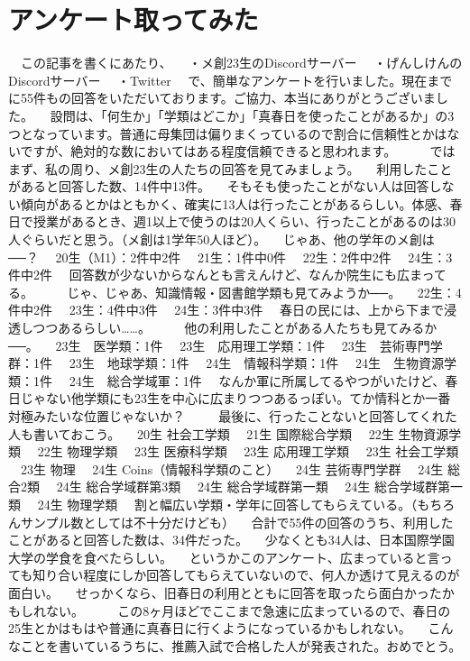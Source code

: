 \documentclass[
paper=a6,
fontsize=7pt,jafontsize=7pt,
baselineskip=1.6zh,
book,
hanging_punctuation,
head_space=10truemm,foot_space=10truemm
]{jlreq}
\begin{document}
\chapter{アンケート取ってみた}
　この記事を書くにあたり、
　・メ創23生のDiscordサーバー
　・げんしけんのDiscordサーバー
　・Twitter
　で、簡単なアンケートを行いました。現在までに55件もの回答をいただいております。ご協力、本当にありがとうございました。
　設問は、「何生か」「学類はどこか」「真春日を使ったことがあるか」の3つとなっています。普通に母集団は偏りまくっているので割合に信頼性とかはないですが、絶対的な数においてはある程度信頼できると思われます。
　
　ではまず、私の周り、メ創23生の人たちの回答を見てみましょう。
　利用したことがあると回答した数、14件中13件。
　そもそも使ったことがない人は回答しない傾向があるとかはともかく、確実に13人は行ったことがあるらしい。体感、春日で授業があるとき、週1以上で使うのは20人くらい、行ったことがあるのは30人ぐらいだと思う。（メ創は1学年50人ほど）。
　じゃあ、他の学年のメ創は──？
　20生（M1）：2件中2件
　21生：1件中0件
　22生：2件中2件
　24生：3件中2件
　回答数が少ないからなんとも言えんけど、なんか院生にも広まってる。
　
　じゃ、じゃあ、知識情報・図書館学類も見てみようか──。
　22生：4件中2件
　23生：4件中3件
　24生：3件中3件
　春日の民には、上から下まで浸透しつつあるらしい……。
　
　他の利用したことがある人たちも見てみるか──。
　23生　医学類：1件
　23生　応用理工学類：1件
　23生　芸術専門学群：1件
　23生　地球学類：1件
　24生　情報科学類：1件
　24生　生物資源学類：1件
　24生　総合学域軍：1件
　なんか軍に所属してるやつがいたけど、春日じゃない他学類にも23生を中心に広まりつつあるっぽい。てか情科とか一番対極みたいな位置じゃないか？
　
　最後に、行ったことないと回答してくれた人も書いておこう。
　20生	社会工学類
　21生	国際総合学類
　22生	生物資源学類
　22生	物理学類
　23生	医療科学類
　23生	応用理工学類
　23生	社会工学類
　23生	物理
　24生	Coins（情報科学類のこと）
　24生	芸術専門学群
　24生	総合2類
　24生	総合学域群第3類
　24生	総合学域群第一類
　24生	総合学域群第一類
　24生	物理学類
　割と幅広い学類・学年に回答してもらえている。（もちろんサンプル数としては不十分だけども）
　合計で55件の回答のうち、利用したことがあると回答した数は、34件だった。
　少なくとも34人は、日本国際学園大学の学食を食べたらしい。
　というかこのアンケート、広まっていると言っても知り合い程度にしか回答してもらえていないので、何人か透けて見えるのが面白い。
　せっかくなら、旧春日の利用とともに回答を取ったら面白かったかもしれない。
　
　この8ヶ月ほどでここまで急速に広まっているので、春日の25生とかはもはや普通に真春日に行くようになっているかもしれない。
　こんなことを書いているうちに、推薦入試で合格した人が発表された。おめでとう。
\end{document}
